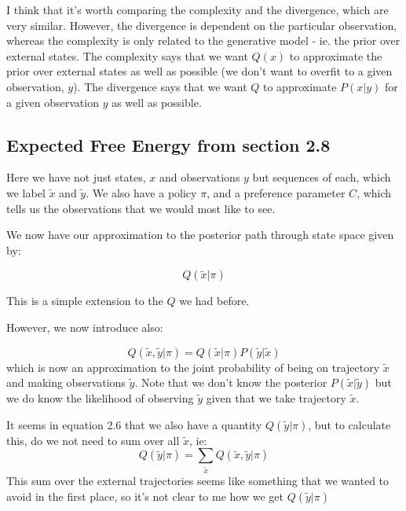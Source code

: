 \documentclass[11pt,oneside]{memoir}
\begin{document}
I think that it's worth comparing the complexity and the divergence, which are very similar. However, the divergence is dependent on the particular observation, whereas the complexity is only related to the generative model - ie. the prior over external states. The complexity says that we want $Q(x)$ to approximate the prior over external states as well as possible (we don't want to overfit to a given observation, $y$). The divergence says that we want $Q$ to approximate $P(x|y)$ for a given observation $y$ as well as possible.

\subsection{Expected Free Energy from section 2.8}

Here we have not just states, $x$ and observations $y$ but sequences of each, which we label $\tilde{x}$ and $\tilde{y}$. We also have a policy $\pi$, and a preference parameter $C$, which tells us the observations that we would most like to see.

We now have our approximation to the posterior path through state space given by:

\begin{equation}Q(\tilde{x}|\pi)\end{equation}

This is a simple extension to the $Q$ we had before.

However, we now introduce also:

\begin{equation}Q(\tilde{x},\tilde{y}|\pi)=Q(\tilde{x}|\pi)P(\tilde{y}|\tilde{x})\end{equation}
which is now an approximation to the joint probability of being on trajectory $\tilde{x}$ and making observations $\tilde{y}$. Note that we don't know the posterior $P(\tilde{x}|\tilde{y})$ but we do know the likelihood of observing $\tilde{y}$ given that we take trajectory $\tilde{x}$.

It seems in equation 2.6 that we also have a quantity $Q(\tilde{y}|\pi)$, but to calculate this, do we not need to sum over all $\tilde{x}$, ie:
\begin{equation}
    Q(\tilde{y}|\pi)=\sum_{\tilde{x}} Q(\tilde{x},\tilde{y}|\pi)
\end{equation}
This sum over the external trajectories seems like something that we wanted to avoid in the first place, so it's not clear to me how we get $Q(\tilde{y}|\pi)$
\end{document}
